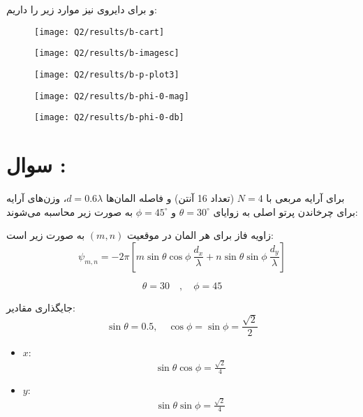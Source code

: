 \documentclass[12pt,onecolumn,a4paper]{article}
\newcommand\question[1][\space]{
	\section[سوال \tartibi{section}]
	{سوال \tartibi{section}: #1}
}
\begin{document}
و برای دایروی نیز موارد زیر را داریم:


\begin{figure}[H]
	\centering
	\texttt{[image: Q2/results/b-cart]}
	\caption{}
	\label{fig:b-cart}
\end{figure}
\begin{figure}[H]
	\centering
	\texttt{[image: Q2/results/b-imagesc]}
	\caption{}
	\label{fig:b-imagesc}
\end{figure}
\begin{figure}[H]
	\centering
	\texttt{[image: Q2/results/b-p-plot3]}
	\caption{}
	\label{fig:b-p-plot3}
\end{figure}
\begin{figure}[H]
	\centering
	\texttt{[image: Q2/results/b-phi-0-mag]}
	\caption{}
	\label{fig:b-phi-0-mag}
\end{figure}
\begin{figure}[H]
	\centering
	\texttt{[image: Q2/results/b-phi-0-db]}
	\caption{}
	\label{fig:b-phi-0-db}
\end{figure}





	
	
	
	\FloatBarrier\question[]%
	
	





	
	برای آرایه مربعی با \(N = 4\) (تعداد 16 آنتن) و فاصله المان‌ها \(d = 0.6\lambda\)، وزن‌های آرایه برای چرخاندن پرتو اصلی به زوایای \(\theta = 30^\circ\) و \(\phi = 45^\circ\) به صورت زیر محاسبه می‌شوند:
	

	زاویه فاز برای هر المان در موقعیت \((m, n)\) به صورت زیر است:
	\[
	\psi_{m,n} = -2\pi \left[m \sin\theta \cos\phi \ \frac{d_x}{\lambda} + n \sin\theta \sin\phi\ \frac{d_y}{\lambda} \right]
	\]
	
		\begin{equation}
		\theta = 30
		\quad,\quad
		\phi = 45
	\end{equation}

	
	
	جایگذاری مقادیر:
	\[
	\sin\theta = 0.5, \quad \cos\phi = \sin\phi = \frac{\sqrt{2}}{2}
	\]
	
		\begin{itemize}
		\item \(x\):
		\[
		\sin\theta \cos\phi =  \tfrac{\sqrt{2}}{4}
		\]
		\item \(y\):
		\[
		\sin\theta \sin\phi = \tfrac{\sqrt{2}}{4}
		\]
	\end{itemize}
	
\end{document}
